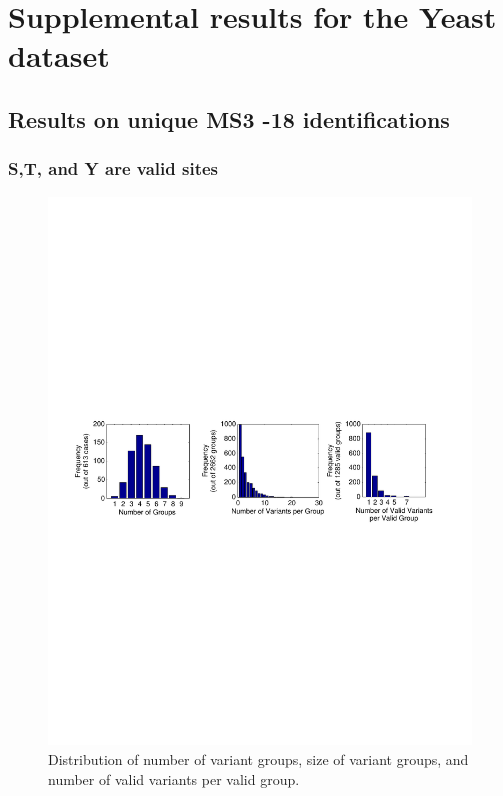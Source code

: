 \setcounter{page}{1}
\setcounter{figure}{0}  %

\section{Supplemental results for the Yeast dataset}
\subsection{Results on unique MS3 -18 identifications}
\subsubsection{S,T, and Y are valid sites}

\begin{figure}[htbp]
\centering %
\includegraphics[trim = 2mm 105mm 4mm 105mm,
clip,width=\textwidth]{fig/phospho/uniqueIds/size_dist_uniq_by_STY.pdf}
\caption{Distribution of number of variant groups, size of variant groups, and number of valid variants per valid group.}
\label{fig:yeast_sizedist_STY}
\end{figure}


